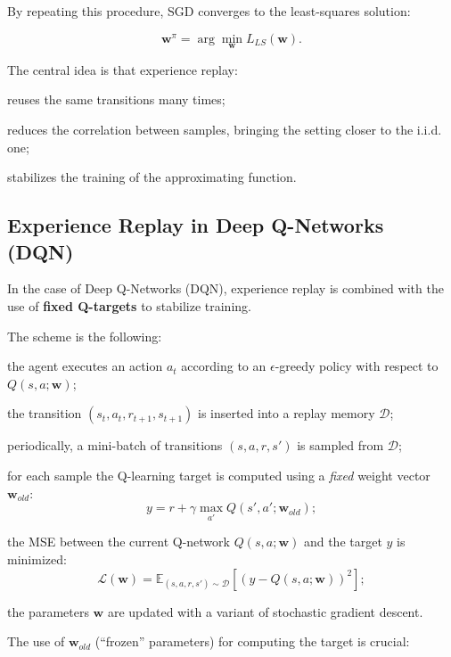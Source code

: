 By repeating this procedure, SGD converges to the least-squares solution:

\[
\mathbf{w}^\pi = \arg\min_{\mathbf{w}} L_{LS}(\mathbf{w}).
\]

The central idea is that experience replay:

\begin{compactitemize}
    \item reuses the same transitions many times;
    \item reduces the correlation between samples, bringing the setting closer to the i.i.d. one;
    \item stabilizes the training of the approximating function.
\end{compactitemize}

\subsection{Experience Replay in Deep Q-Networks (DQN)}

In the case of Deep Q-Networks (DQN), experience replay is combined with the use of \textbf{fixed Q-targets} to stabilize training.

The scheme is the following:

\begin{compactitemize}
    \item the agent executes an action $a_t$ according to an $\epsilon$-greedy policy with respect to $Q(s,a;\mathbf{w})$;
    \item the transition $(s_t, a_t, r_{t+1}, s_{t+1})$ is inserted into a replay memory $\mathcal{D}$;
    \item periodically, a mini-batch of transitions $(s,a,r,s')$ is sampled from $\mathcal{D}$;
    \item for each sample the Q-learning target is computed using a \emph{fixed} weight vector $\mathbf{w}_{old}$:
    \[
    y = r + \gamma \max_{a'} Q(s',a'; \mathbf{w}_{old});
    \]
    \item the MSE between the current Q-network $Q(s,a;\mathbf{w})$ and the target $y$ is minimized:
    \[
    \mathcal{L}(\mathbf{w})
    =
    \mathbb{E}_{(s,a,r,s') \sim \mathcal{D}}
    \left[
    \left( y - Q(s,a; \mathbf{w}) \right)^2
    \right];
    \]
    \item the parameters $\mathbf{w}$ are updated with a variant of stochastic gradient descent.
\end{compactitemize}

The use of $\mathbf{w}_{old}$ (``frozen'' parameters) for computing the target is crucial:

